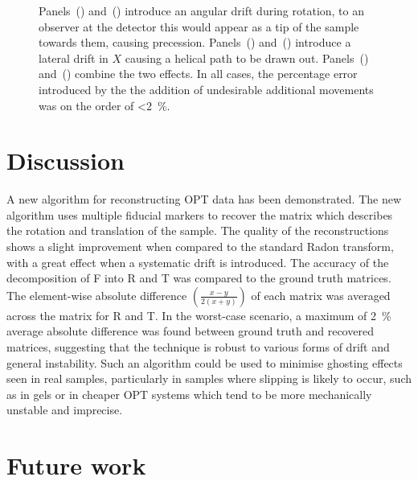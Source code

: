\documentclass{osa-article}
\begin{document}
\begin{figure}
{          Panels~() and~() introduce an angular drift during rotation, to an observer at the detector this would appear as a tip of the sample towards them, causing precession.
          Panels~() and~() introduce a lateral drift in \(X\) causing a helical path to be drawn out.
          Panels~() and~() combine the two effects.
          In all cases, the percentage error introduced by the the addition of undesirable additional movements was on the order of \SI{<2}{\percent}.
          }\label{fig:pc_sum_decompose}
\end{figure}

\section{Discussion}

A new algorithm for reconstructing OPT data has been demonstrated.
The new algorithm uses multiple fiducial markers to recover the matrix which describes the rotation and translation of the sample.
The quality of the reconstructions shows a slight improvement when compared to the standard \gls{Radon transform}, with a great effect when a systematic drift is introduced.
The accuracy of the decomposition of \gls{F} into \gls{R} and \gls{T} was compared to the ground truth matrices.
The element-wise absolute difference \(\left(\frac{x-y}{2(x+y)}\right)\) of each matrix was averaged across the matrix for \gls{R} and \gls{T}.
In the worst-case scenario, a maximum of \SI{2}{\percent} average absolute difference was found between ground truth and recovered matrices,
suggesting that the technique is robust to various forms of drift and general instability.
Such an algorithm could be used to minimise ghosting effects seen in real samples, particularly in samples where slipping is likely to occur, such as in gels or in cheaper \gls{OPT} systems which tend to be more mechanically unstable and imprecise.

\section{Future work}
\end{document}
